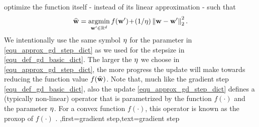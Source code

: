 {{		optimize the function itself - instead of its linear approximation - such that
		\begin{align} 
		\label{equ_approx_gd_step_dict}
		\widehat{{\bf w}} = \operatorname*{argmin}_{{\bf w}' \in \mathbb{R}^{d}} f({\bf w}')\!+\!(1/\eta)\left\Vert {{\bf w}-{\bf w}'} \right\Vert_{2}^2. 
		\end{align}
		We intentionally use the same symbol $\eta$ for the parameter in \eqref{equ_approx_gd_step_dict} 
		as we used for the \gls{stepsize} in \eqref{equ_def_gd_basic_dict}. The larger the $\eta$ we choose in 
		\eqref{equ_approx_gd_step_dict}, the more progress the update will make towards reducing the 
		function value $f(\widehat{{\bf w}})$. Note that, much like the \gls{gradient} step \eqref{equ_def_gd_basic_dict}, 
		also the update \eqref{equ_approx_gd_step_dict} defines a (typically non-linear) operator 
		that is parametrized by the function $f(\cdot)$ and the parameter $\eta$. For a \gls{convex} function 
		$f(\cdot)$, this operator is known as the \gls{proxop} of $f(\cdot)$ \cite{ProximalMethods}. 
		},first={gradient step},text={gradient step}}
	


